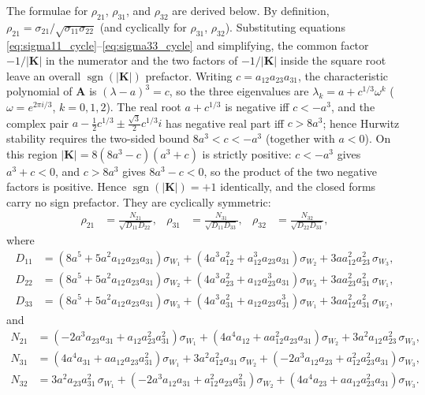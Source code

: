 \documentclass{article}
\begin{document}
The formulae for $\rho_{21}$, $\rho_{31}$, and $\rho_{32}$ are derived below. By definition,
$\rho_{21}=\sigma_{21}/\sqrt{\sigma_{11}\sigma_{22}}$ (and cyclically for
$\rho_{31}$, $\rho_{32}$). Substituting equations \ref{eq:sigma11_cycle}--\ref{eq:sigma33_cycle}
and simplifying, the common factor $-1/|\mathbf{K}|$ in the numerator and the two factors of
$-1/|\mathbf{K}|$ inside the square root leave an overall $\operatorname{sgn}(|\mathbf{K}|)$
prefactor. Writing $c=a_{12}a_{23}a_{31}$, the characteristic polynomial of $\mathbf{A}$ is
$(\lambda-a)^3=c$, so the three eigenvalues are $\lambda_k=a+c^{1/3}\omega^k$ ($\omega=e^{2\pi i/3}$,
$k=0,1,2$). The real root $a+c^{1/3}$ is negative iff $c<-a^3$, and the complex pair
$a-\tfrac12 c^{1/3}\pm\tfrac{\sqrt3}{2}c^{1/3}i$ has negative real part iff $c>8a^3$; hence
Hurwitz stability requires the two-sided bound $8a^3<c<-a^3$ (together with $a<0$). On this
region $|\mathbf{K}|=8(8a^3-c)(a^3+c)$ is strictly positive: $c<-a^3$ gives $a^3+c<0$, and
$c>8a^3$ gives $8a^3-c<0$, so the product of the two negative factors is positive. Hence
$\operatorname{sgn}(|\mathbf{K}|)=+1$ identically, and the closed forms carry no sign prefactor.
They are cyclically symmetric:
\begin{align}
\rho_{21} &= \frac{N_{21}}{\sqrt{D_{11}D_{22}}}, &
\rho_{31} &= \frac{N_{31}}{\sqrt{D_{11}D_{33}}}, &
\rho_{32} &= \frac{N_{32}}{\sqrt{D_{22}D_{33}}},
\label{eq:rho_cycle}
\end{align}
where
\begin{align}
D_{11} &= \left(8a^5+5a^2a_{12}a_{23}a_{31}\right)\sigma_{W_1} + \left(4a^3a_{12}^2+a_{12}^3a_{23}a_{31}\right)\sigma_{W_2} + 3aa_{12}^2a_{23}^2\,\sigma_{W_3}, \label{eq:D11_cycle}\\
D_{22} &= \left(8a^5+5a^2a_{12}a_{23}a_{31}\right)\sigma_{W_2} + \left(4a^3a_{23}^2+a_{12}a_{23}^3a_{31}\right)\sigma_{W_3} + 3aa_{23}^2a_{31}^2\,\sigma_{W_1}, \label{eq:D22_cycle}\\
D_{33} &= \left(8a^5+5a^2a_{12}a_{23}a_{31}\right)\sigma_{W_3} + \left(4a^3a_{31}^2+a_{12}a_{23}a_{31}^3\right)\sigma_{W_1} + 3aa_{12}^2a_{31}^2\,\sigma_{W_2}, \label{eq:D33_cycle}
\end{align}
and
\begin{align}
N_{21} &= \left(-2a^3a_{23}a_{31}+a_{12}a_{23}^2a_{31}^2\right)\sigma_{W_1} + \left(4a^4a_{12}+aa_{12}^2a_{23}a_{31}\right)\sigma_{W_2} + 3a^2a_{12}a_{23}^2\,\sigma_{W_3}, \label{eq:N21_cycle}\\
N_{31} &= \left(4a^4a_{31}+aa_{12}a_{23}a_{31}^2\right)\sigma_{W_1} + 3a^2a_{12}^2a_{31}\,\sigma_{W_2} + \left(-2a^3a_{12}a_{23}+a_{12}^2a_{23}^2a_{31}\right)\sigma_{W_3}, \label{eq:N31_cycle}\\
N_{32} &= 3a^2a_{23}a_{31}^2\,\sigma_{W_1} + \left(-2a^3a_{12}a_{31}+a_{12}^2a_{23}a_{31}^2\right)\sigma_{W_2} + \left(4a^4a_{23}+aa_{12}a_{23}^2a_{31}\right)\sigma_{W_3}. \label{eq:N32_cycle}
\end{align}



\end{document}

